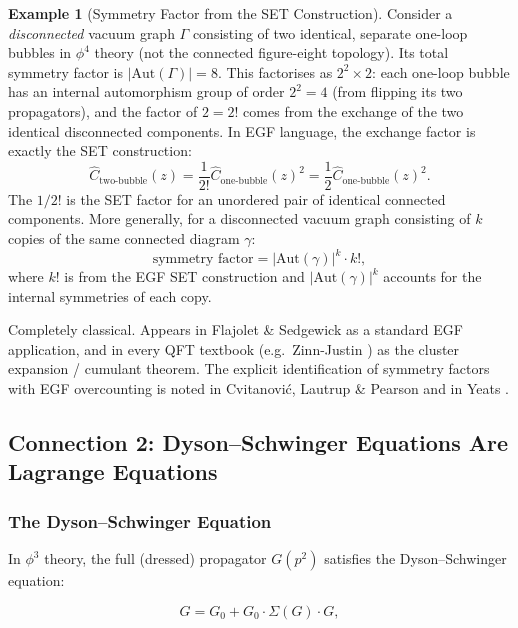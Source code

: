 \documentclass[11pt,a4paper]{article}
\theoremstyle{definition}
\newtheorem{example}[theorem]{Example}
\begin{document}
\begin{example}[Symmetry Factor from the SET Construction]
Consider a \emph{disconnected} vacuum graph $\Gamma$ consisting of two identical,
separate one-loop bubbles in $\phi^4$ theory (not the connected figure-eight
topology). Its total symmetry factor is $|\mathrm{Aut}(\Gamma)| = 8$. This
factorises as $2^2 \times 2$: each one-loop bubble has an internal automorphism
group of order $2^2 = 4$ (from flipping its two propagators), and the factor
of $2 = 2!$ comes from the exchange of the two identical disconnected components.
In EGF language, the exchange factor is exactly the SET construction:
\[
  \hat{C}_{\text{two-bubble}}(z) = \frac{1}{2!}\hat{C}_{\text{one-bubble}}(z)^2
  = \frac{1}{2}\hat{C}_{\text{one-bubble}}(z)^2.
\]
The $1/2!$ is the SET factor for an unordered pair of identical connected
components. More generally, for a disconnected vacuum graph consisting of $k$
copies of the same connected diagram $\gamma$:
\[
  \text{symmetry factor} = |\mathrm{Aut}(\gamma)|^k \cdot k!,
\]
where $k!$ is from the EGF SET construction and $|\mathrm{Aut}(\gamma)|^k$
accounts for the internal symmetries of each copy.
\end{example}

\begin{resultbox}[Status]
Completely classical. Appears in Flajolet \& Sedgewick \cite{flajolet2009}
as a standard EGF application, and in every QFT textbook (e.g.\
Zinn-Justin \cite{zinjustin2002}) as the cluster expansion / cumulant theorem.
The explicit identification of symmetry factors with EGF overcounting is
noted in Cvitanovi\'c, Lautrup \& Pearson \cite{cvitanovic1978} and in Yeats \cite{yeats2017}.
\end{resultbox}

\subsection{Connection 2: Dyson--Schwinger Equations Are Lagrange Equations}
\label{sec:dse_lagrange}

\subsubsection{The Dyson--Schwinger Equation}

In $\phi^3$ theory, the full (dressed) propagator $G(p^2)$ satisfies the
Dyson--Schwinger equation:

\begin{equation}
  G = G_0 + G_0 \cdot \Sigma(G) \cdot G,
  \label{eq:dse}
\end{equation}
\end{document}
